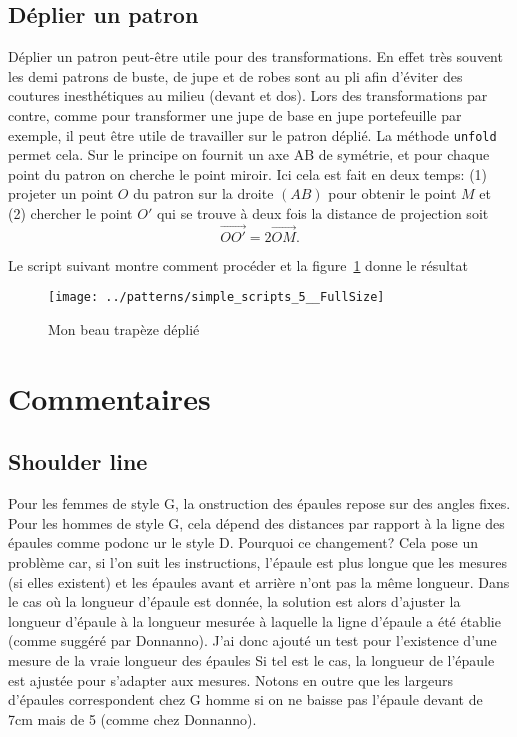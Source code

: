 \documentclass[10pt,a4paper,twoside]{report}
\begin{document}
\section{Déplier un patron}
Déplier un patron peut-être utile pour des transformations. En effet très souvent les demi patrons de buste, de jupe et de robes sont au pli afin d'éviter des coutures inesthétiques au milieu (devant et dos). Lors des transformations par contre, comme pour transformer une jupe de base en jupe portefeuille par exemple, il peut être utile de travailler sur le patron déplié.   La méthode \texttt{unfold} permet cela. Sur le principe on fournit  un axe AB de symétrie, et pour chaque point du patron on cherche le point miroir. Ici cela est fait en deux temps: (1) projeter un point $O$ du patron sur la droite $(AB)$ pour obtenir le point $M$ et (2) chercher le point $O'$ qui se trouve à deux fois la distance de projection soit
$$\overrightarrow{OO'} = 2\overrightarrow{OM}.$$

Le script suivant montre comment procéder et la figure~\ref{fig:unfold} donne le résultat




\begin{figure}
\begin{center}
\texttt{[image: ../patterns/simple\_scripts\_5\_\_FullSize]}
\end{center}
\caption{Mon beau trapèze déplié}
\label{fig:unfold}
\end{figure}





\chapter{Commentaires}


\section{Shoulder line}

Pour les femmes de style G, la  onstruction des épaules repose sur des angles fixes. Pour les hommes de style G, cela dépend des distances par rapport à la ligne des épaules comme podonc ur le style D. Pourquoi ce changement? Cela pose un problème car, si l'on suit les instructions, l'épaule est plus longue que les mesures (si elles existent) et les épaules avant et arrière n'ont pas la même longueur. Dans le cas où la longueur d'épaule est donnée, la solution est alors d'ajuster la longueur d'épaule à la longueur mesurée à laquelle la ligne d'épaule a été établie (comme suggéré par Donnanno). J'ai donc ajouté un test pour l'existence d'une mesure de la vraie longueur des épaules Si tel est le cas, la longueur de l'épaule est ajustée pour s'adapter aux mesures. Notons en outre que les largeurs d'épaules correspondent chez G homme si on ne baisse pas l'épaule devant de 7cm mais de 5 (comme chez Donnanno).
\end{document}
